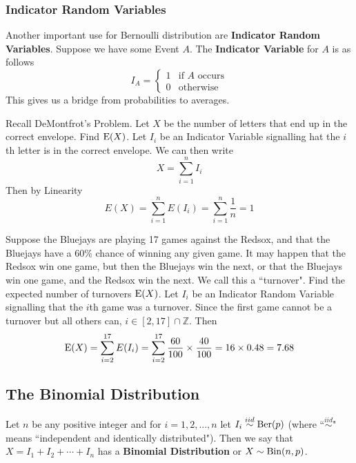 \documentclass{report}
\begin{document}
\subsubsection{Indicator Random Variables}
Another important use for Bernoulli distribution are \textbf{Indicator Random Variables}. Suppose we have some Event $A$. The \textbf{Indicator Variable} for $A$ is as follows
\[
    I_A=\begin{cases}
        1 & \text{if $A$ occurs}\\
        0 & \text{otherwise}
    \end{cases}
\]
This gives us a bridge from probabilities to averages.
\begin{example}
    Recall DeMontfrot's Problem. Let $X$ be the number of letters that end up in the correct envelope. Find $\textup{E}(X)$.
    \solution
    Let $I_i$ be an Indicator Variable signalling hat the $i$th letter is in the correct envelope. We can then write
    \[
        X=\sum_{i=1}^n I_i
    \]
    Then by Linearity
    \[
         E(X)=\sum_{i=1}^n E(I_i) = \sum_{i=1}^n \frac 1n = 1
    \]
\end{example}
\begin{example}
    Suppose the Bluejays are playing 17 games against the Redsox, and that the Bluejays have a 60\% chance of winning any given game. It may happen that the Redsox win one game, but then the Bluejays win the next, or that the Bluejays win one game, and the Redsox win the next. We call this a ``turnover". Find the expected number of turnovers $\textup{E}(X)$.
    \solution
    Let $I_i$ be an Indicator Random Variable signalling that the $i$th game was a turnover. Since the first game cannot be a turnover but all others can, $i\in[2,17]\cap\mathbb Z$. Then
    \[
        \textup{E}(X)=\sum_{i=2}^{17} E(I_i)=\sum_{i=2}^{17} \frac {60}{100} \times \frac{40}{100}=16\times 0.48 = 7.68
    \]
\end{example}

\subsection{The Binomial Distribution}
\newcommand{\simiid}{\overset{iid}\sim}
\newcommand{\bin}{\textup{Bin}}
Let $n$ be any positive integer and for $i=1,2,...,n$ let $I_i \simiid \ber(p)$ (where ``$\simiid$" means ``independent and identically distributed"). Then we say that $X=I_1+I_2+\cdots + I_n$ has a \textbf{Binomial Distribution} or $X\sim \bin(n,p)$.
\end{document}
